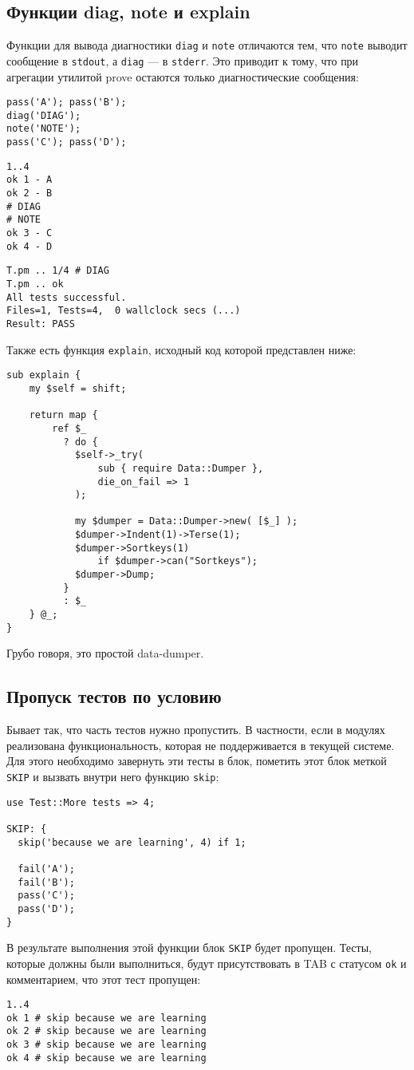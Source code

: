 \subsection{Функции diag, note и explain}
Функции для вывода диагностики \verb|diag| и \verb|note| отличаются тем, что \verb|note| выводит сообщение в \verb|stdout|, а \verb|diag| --- в \verb|stderr|. Это приводит к тому, что при агрегации утилитой prove остаются только диагностические сообщения:
\begin{verbatim}
pass('A'); pass('B');
diag('DIAG');
note('NOTE');
pass('C'); pass('D');
\end{verbatim}
\begin{verbatim}
1..4
ok 1 - A
ok 2 - B
# DIAG
# NOTE
ok 3 - C
ok 4 - D
\end{verbatim}
\begin{verbatim}
T.pm .. 1/4 # DIAG
T.pm .. ok
All tests successful.
Files=1, Tests=4,  0 wallclock secs (...)
Result: PASS
\end{verbatim}
Также есть функция \verb|explain|, исходный код которой представлен ниже:
\begin{verbatim}
sub explain {
    my $self = shift;

    return map {
        ref $_
          ? do {
            $self->_try(
                sub { require Data::Dumper },
                die_on_fail => 1
            );

            my $dumper = Data::Dumper->new( [$_] );
            $dumper->Indent(1)->Terse(1);
            $dumper->Sortkeys(1)
                if $dumper->can("Sortkeys");
            $dumper->Dump;
          }
          : $_
    } @_;
}
\end{verbatim}
Грубо говоря, это простой data-dumper.

\subsection{Пропуск тестов по условию}
Бывает так, что часть тестов нужно пропустить. В частности, если в модулях реализована функциональность, которая не поддерживается в текущей системе. Для этого необходимо завернуть эти тесты в блок, пометить этот блок меткой \verb|SKIP| и вызвать внутри него функцию \verb|skip|:
\begin{verbatim}
use Test::More tests => 4;

SKIP: {
  skip('because we are learning', 4) if 1;

  fail('A');
  fail('B');
  pass('C');
  pass('D');
}
\end{verbatim}
В результате выполнения этой функции блок \verb|SKIP| будет пропущен. Тесты, которые должны были выполниться, будут присутствовать в TAB с статусом \verb|ok| и комментарием, что этот тест пропущен:
\begin{verbatim}
1..4
ok 1 # skip because we are learning
ok 2 # skip because we are learning
ok 3 # skip because we are learning
ok 4 # skip because we are learning
\end{verbatim}

